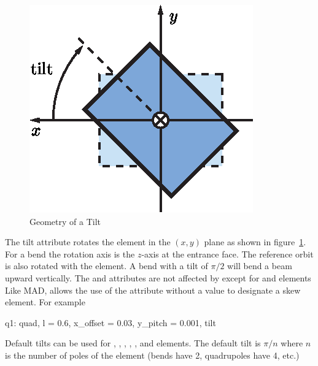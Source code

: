\begin{figure}[ht]
  \centering
  \includegraphics{tilt.eps}
  \caption{Geometry of a Tilt}
  \label{f:tilt}
\end{figure}

The tilt attribute rotates the element in the $(x, y)$ plane as
shown in figure~\ref{f:tilt}. For a bend the rotation axis is the
$z$-axis at the entrance face. The reference orbit is also rotated
with the element. A bend with a tilt of $\pi/2$ will bend a beam
upward vertically. The  and  attributes are
not affected by  except for  and 
elements
Like MAD, \bmad allows the use of the  attribute without
a value to designate a skew element. For example
\begin{example}
  q1: quad, l = 0.6, x_offset = 0.03, y_pitch = 0.001, tilt
\end{example}
Default tilts can be used for , , ,
, , and  elements.
The default tilt is $\pi/n$ where $n$ is the number of poles of the
element (bends have 2, quadrupoles have 4, etc.) 


